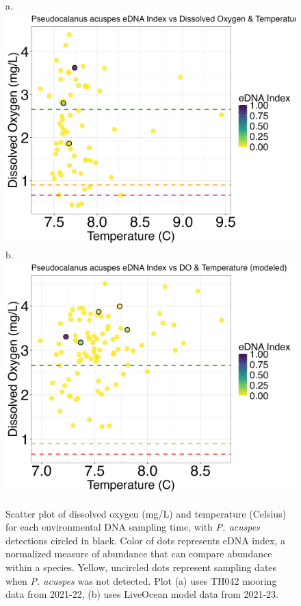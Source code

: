 \documentclass[12pt,twoside]{reedthesis}
\begin{document}
	\begin{figure}[!h]
		\begin{center}
			a. \includegraphics[scale=0.3]{Pacuspes_Scatter_noOut}
			b. \includegraphics[scale=0.3]{Pacuspes_Scatter_AllYr_mod_noOut}
			\caption[\textit{P. acuspes} scatterplot]{\footnotesize{Scatter plot of dissolved oxygen (mg/L) and temperature (Celsius) for each environmental DNA sampling time, with \textit{P. acuspes} detections circled in black. Color of dots represents eDNA index, a normalized measure of abundance that can compare abundance within a species. Yellow, uncircled dots represent sampling dates when \textit{P. acuspes} was not detected. Plot (a) uses TH042 mooring data from 2021-22, (b) uses LiveOcean model data from 2021-23.}} %
		\end{center}
		\label{PacuspesScatter}
	\end{figure} 
	
\end{document}
